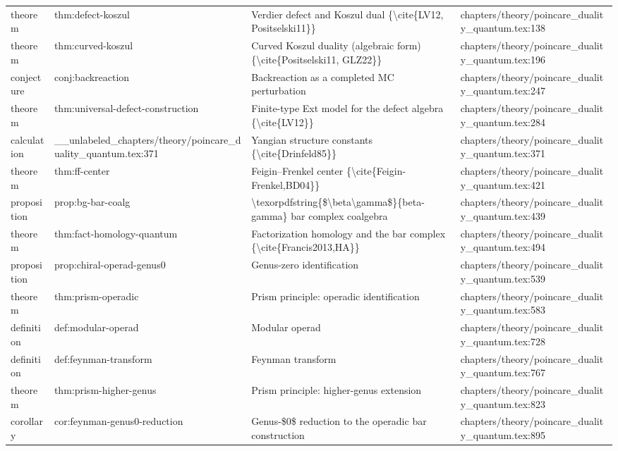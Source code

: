 \documentclass[11pt]{article}
\begin{document}
\begin{longtable}{L{0.10\textwidth}L{0.26\textwidth}L{0.42\textwidth}L{0.22\textwidth}}
theorem & thm:defect-koszul & Verdier defect and Koszul dual \{\textbackslash{}cite\{LV12, Positselski11\}\} & chapters/theory/poincare\_duality\_quantum.tex:138\\
theorem & thm:curved-koszul & Curved Koszul duality (algebraic form) \{\textbackslash{}cite\{Positselski11, GLZ22\}\} & chapters/theory/poincare\_duality\_quantum.tex:196\\
conjecture & conj:backreaction & Backreaction as a completed MC perturbation & chapters/theory/poincare\_duality\_quantum.tex:247\\
theorem & thm:universal-defect-construction & Finite-type Ext model for the defect algebra \{\textbackslash{}cite\{LV12\}\} & chapters/theory/poincare\_duality\_quantum.tex:284\\
calculation & \_\_unlabeled\_chapters/theory/poincare\_duality\_quantum.tex:371 & Yangian structure constants \{\textbackslash{}cite\{Drinfeld85\}\} & chapters/theory/poincare\_duality\_quantum.tex:371\\
theorem & thm:ff-center & Feigin--Frenkel center \{\textbackslash{}cite\{Feigin-Frenkel,BD04\}\} & chapters/theory/poincare\_duality\_quantum.tex:421\\
proposition & prop:bg-bar-coalg & \textbackslash{}texorpdfstring\{\$\textbackslash{}beta\textbackslash{}gamma\$\}\{beta-gamma\} bar complex coalgebra & chapters/theory/poincare\_duality\_quantum.tex:439\\
theorem & thm:fact-homology-quantum & Factorization homology and the bar complex \{\textbackslash{}cite\{Francis2013,HA\}\} & chapters/theory/poincare\_duality\_quantum.tex:494\\
proposition & prop:chiral-operad-genus0 & Genus-zero identification & chapters/theory/poincare\_duality\_quantum.tex:539\\
theorem & thm:prism-operadic & Prism principle: operadic identification & chapters/theory/poincare\_duality\_quantum.tex:583\\
definition & def:modular-operad & Modular operad & chapters/theory/poincare\_duality\_quantum.tex:728\\
definition & def:feynman-transform & Feynman transform & chapters/theory/poincare\_duality\_quantum.tex:767\\
theorem & thm:prism-higher-genus & Prism principle: higher-genus extension & chapters/theory/poincare\_duality\_quantum.tex:823\\
corollary & cor:feynman-genus0-reduction & Genus-\$0\$ reduction to the operadic bar construction & chapters/theory/poincare\_duality\_quantum.tex:895\\

\end{longtable}
\end{document}
